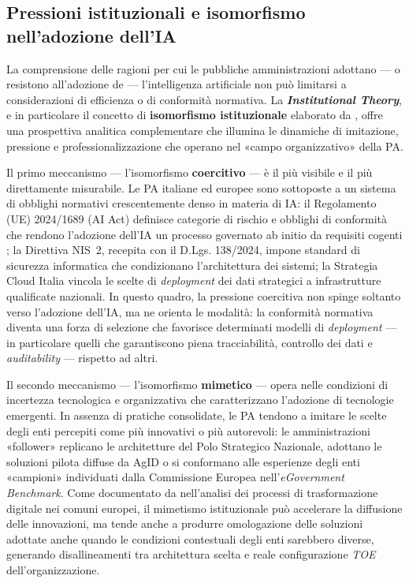 \subsection{Pressioni istituzionali e isomorfismo nell'adozione dell'IA}
\label{subsec:isomorfismo-ia}

La comprensione delle ragioni per cui le pubbliche amministrazioni adottano — o resistono all'adozione de — l'intelligenza artificiale non può limitarsi a considerazioni di efficienza o di conformità normativa. La \textbf{\textit{Institutional Theory}}, e in particolare il concetto di \textbf{isomorfismo istituzionale} elaborato da \textcite{DiMaggioPow1983}, offre una prospettiva analitica complementare che illumina le dinamiche di imitazione, pressione e professionalizzazione che operano nel «campo organizzativo» della PA.

Il primo meccanismo — l'isomorfismo \textbf{coercitivo} — è il più visibile e il più direttamente misurabile. Le PA italiane ed europee sono sottoposte a un sistema di obblighi normativi crescentemente denso in materia di IA: il Regolamento (UE) 2024/1689 (AI Act) definisce categorie di rischio e obblighi di conformità che rendono l'adozione dell'IA un processo governato ab initio da requisiti cogenti \parencite{AIAct2024}; la Direttiva NIS~2, recepita con il D.Lgs. 138/2024, impone standard di sicurezza informatica che condizionano l'architettura dei sistemi; la Strategia Cloud Italia vincola le scelte di \textit{deployment} dei dati strategici a infrastrutture qualificate nazionali. In questo quadro, la pressione coercitiva non spinge soltanto verso l'adozione dell'IA, ma ne orienta le modalità: la conformità normativa diventa una forza di selezione che favorisce determinati modelli di \textit{deployment} — in particolare quelli che garantiscono piena tracciabilità, controllo dei dati e \textit{auditability} — rispetto ad altri.

Il secondo meccanismo — l'isomorfismo \textbf{mimetico} — opera nelle condizioni di incertezza tecnologica e organizzativa che caratterizzano l'adozione di tecnologie emergenti. In assenza di pratiche consolidate, le PA tendono a imitare le scelte degli enti percepiti come più innovativi o più autorevoli: le amministrazioni «follower» replicano le architetture del Polo Strategico Nazionale, adottano le soluzioni pilota diffuse da AgID o si conformano alle esperienze degli enti «campioni» individuati dalla Commissione Europea nell'\textit{eGovernment Benchmark}. Come documentato da \textcite{PatalonIsomorphism2024} nell'analisi dei processi di trasformazione digitale nei comuni europei, il mimetismo istituzionale può accelerare la diffusione delle innovazioni, ma tende anche a produrre omologazione delle soluzioni adottate anche quando le condizioni contestuali degli enti sarebbero diverse, generando disallineamenti tra architettura scelta e reale configurazione \textit{TOE} dell'organizzazione.


